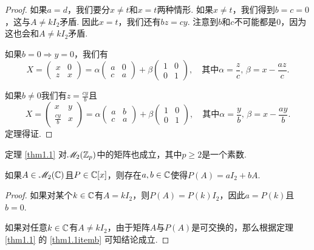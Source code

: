 \begin{proof}
       如果$a=d$，我们要分$x\ne t$和$x=t$两种情形. 如果$x\ne t$，我们得到$b=c=0$，这与$A\ne kI_2$矛盾. 因此$x=t$，我们还有$bz=cy$. 注意到$b$和$c$不可能都是0，因为这也会和$A\ne kI_2$矛盾.

       如果$b=0\Rightarrow y=0$，我们有
       \[
         X = \begin{pmatrix}
           x & 0 \\
           z & x
         \end{pmatrix} = \alpha \begin{pmatrix}
           a & 0 \\
           c & a
         \end{pmatrix} + \beta \begin{pmatrix}
           1 & 0 \\
           0 & 1
         \end{pmatrix},\quad \text{其中$\alpha=\frac zc,\,\beta=x-\frac{az}c$}.
       \]

       如果$b\ne0$我们有$z=\frac{cy}b$且
       \[
         X = \begin{pmatrix}
           x & y \\
           \frac{cy}b & x
         \end{pmatrix} = \alpha \begin{pmatrix}
           a & b \\
           c & a
         \end{pmatrix} + \beta \begin{pmatrix}
           1 & 0 \\
           0 & 1
         \end{pmatrix},\quad \text{其中$\alpha=\frac yb,\,\beta =x-\frac{ay}b$}.
       \]
       定理得证.
  \end{proof}

  \begin{remark}
    定理 \ref{thm1.1} 对$\mathscr M_2(\mathbb Z_p)$中的矩阵也成立，其中$p\ge2$是一个素数.
  \end{remark}

  \begin{corollary}
    如果$A\in\mathscr M_2(\mathbb C)$且$P\in\mathbb C[x]$，则存在$a,b\in\mathbb C$使得$P(A)=aI_2+bA$.
  \end{corollary}
  \begin{proof}
    如果对某个$k\in\mathbb C$有$A=kI_2$，则$P(A)=P(k)I_2$，因此$a=P(k)$且$b=0$.

    如果对任意$k\in\mathbb C$有$A\ne kI_2$，由于矩阵$A$与$P(A)$是可交换的，那么根据定理 \ref{thm1.1} 的 \ref{thm1.1itemb} 可知结论成立.
  \end{proof}

